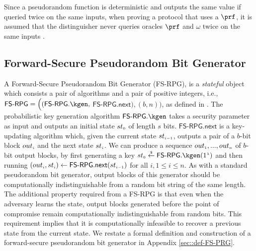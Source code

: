 Since a pseudorandom function is deterministic and outputs the same value if queried twice on the same inputs, when proving a protocol that uses a $\prf$, it is assumed that the distinguisher never queries oracles $\prf$ and $\omega$ twice on the same inputs \cite{KatzLindell2014}. 





%


\subsection{Forward-Secure Pseudorandom Bit Generator}
A Forward-Secure Pseudorandom Bit Generator (FS-RPG), is a \emph{stateful} object which consists a pair of algorithms and a pair of positive integers, i.e., $\mathsf{FS\text{-}RPG} = \Big((\mathsf{FS\text{-}RPG}.\kgen, $ $ \mathsf{FS\text{-}RPG.next}),( b, n)\Big)$, as defined in \cite{BellareY03}.  The probabilistic key generation algorithm $\mathsf{FS\text{-}RPG}.\kgen$ takes a security parameter as input and outputs an initial state ${st}_{\scriptscriptstyle 0}$ of length $s$ bits. $\mathsf{FS\text{-}RPG.next}$ is a key-updating algorithm which, given the current state ${st}_{\scriptscriptstyle i-1}$, outputs a pair of a $b$-bit block ${out}_{\scriptscriptstyle i}$ and the next state ${st}_{\scriptscriptstyle i}$. We can produce a sequence  ${out}_{\scriptscriptstyle 1},..., {out}_{\scriptscriptstyle n}$  of  $b$-bit output blocks, by first generating a key  ${st}_{\sss 0}\stackrel{\sss \$}\leftarrow\mathsf{FS\text{-}RPG}.\kgen(1^{\sss \lambda})$ and then running $({out}_{\scriptscriptstyle i}, st_{\scriptscriptstyle i})\leftarrow  \mathsf{FS\text{-}RPG.next} (st_{\scriptscriptstyle i-1})$ for all $i, 1\leq i\leq n$. As with a standard pseudorandom bit generator, output blocks of this generator should be computationally indistinguishable from a random bit
string of the same length. The additional property required from a
FS-RPG is that even when the
adversary learns the state, output blocks generated before the point of
compromise remain computationally indistinguishable from random bits.
This requirement implies that it is computationally infeasible to
recover a previous state from the current state. We restate a formal definition and construction of a forward-secure pseudorandom bit generator in Appendix \ref{sec::def-FS-PRG}. 


